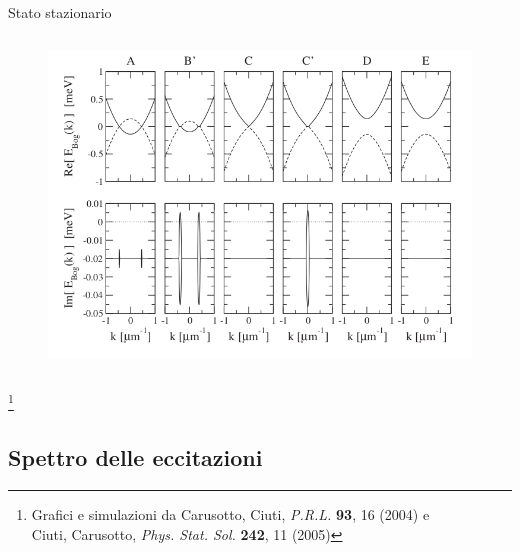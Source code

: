 \documentclass[10pt]{beamer}
\begin{document}
\begin{frame}{Stato stazionario}
\begin{columns}[t]
 \begin{column}{.5\textwidth}
  \begin{figure}
   \includegraphics[width=\columnwidth]{pics/Spectra.png}
  \end{figure}
 \end{column}

\end{columns}
\let\thefootnote\relax\footnote{\scriptsize Grafici e simulazioni da  Carusotto, Ciuti, \emph{P.R.L.} \textbf{93}, 16 (2004) e\\ \hspace{.55cm}Ciuti, Carusotto, \emph{Phys. Stat. Sol.} \textbf{242}, 11 (2005)}

\end{frame}

\subsection{Spettro delle eccitazioni}
\end{document}
